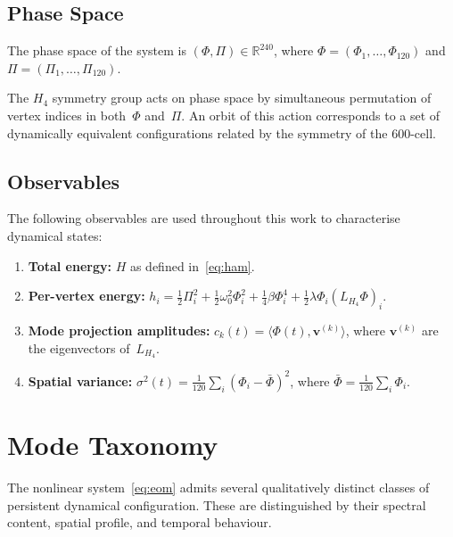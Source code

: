 \documentclass[12pt,a4paper]{article}
\newcommand{\Hfour}{H_4}
\newcommand{\Lmat}{L_{H_4}}
\newcommand{\R}{\mathbb{R}}
\begin{document}
\subsection{Phase Space}

The phase space of the system is $(\Phi, \Pi) \in \R^{240}$, where
$\Phi = (\Phi_1, \ldots, \Phi_{120})$ and
$\Pi = (\Pi_1, \ldots, \Pi_{120})$.

The $\Hfour$ symmetry group acts on phase space by simultaneous
permutation of vertex indices in both~$\Phi$ and~$\Pi$.  An orbit of
this action corresponds to a set of dynamically equivalent
configurations related by the symmetry of the 600-cell.

\subsection{Observables}\label{sec:observables}

The following observables are used throughout this work to characterise
dynamical states:

\begin{enumerate}[nosep]
\item \textbf{Total energy:}
  $H$ as defined in~\eqref{eq:ham}.

\item \textbf{Per-vertex energy:}
  $h_i = \frac{1}{2}\Pi_i^2 + \frac{1}{2}\omega_0^2 \Phi_i^2
  + \frac{1}{4}\beta \Phi_i^4
  + \frac{1}{2}\lambda \Phi_i (\Lmat \Phi)_i$.

\item \textbf{Mode projection amplitudes:}
  $c_k(t) = \langle \Phi(t), \mathbf{v}^{(k)} \rangle$, where
  $\mathbf{v}^{(k)}$ are the eigenvectors of~$\Lmat$.

\item \textbf{Spatial variance:}
  $\sigma^2(t) = \frac{1}{120} \sum_i (\Phi_i - \bar{\Phi})^2$,
  where $\bar{\Phi} = \frac{1}{120} \sum_i \Phi_i$.
\end{enumerate}


\section{Mode Taxonomy}\label{sec:taxonomy}

The nonlinear system~\eqref{eq:eom} admits several qualitatively
distinct classes of persistent dynamical configuration.  These are
distinguished by their spectral content, spatial profile, and temporal
behaviour.
\end{document}
